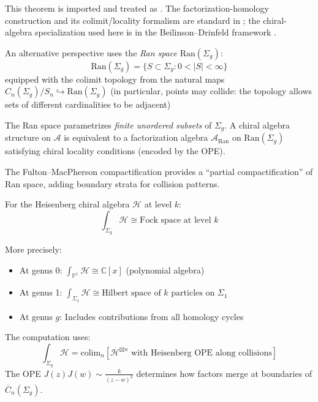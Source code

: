 \begin{remark}
This theorem is imported and treated as \ClaimStatusProvedElsewhere. The
factorization-homology construction and its colimit/locality formalism are
standard in \cite{AF15,CG17}; the chiral-algebra specialization used here is in
the Beilinson--Drinfeld framework \cite[Chapter~3]{BD04}.
\end{remark}

\begin{remark}\label{rem:ran-space}
An alternative perspective uses the \emph{Ran space} $\text{Ran}(\Sigma_g)$:
\[\text{Ran}(\Sigma_g) = \{S \subset \Sigma_g : 0 < |S| < \infty\}\]
equipped with the colimit topology from the natural maps $C_n(\Sigma_g)/S_n \hookrightarrow \text{Ran}(\Sigma_g)$
(in particular, points may collide: the topology allows sets of different cardinalities to be adjacent)

The Ran space parametrizes \emph{finite unordered subsets} of $\Sigma_g$. A chiral algebra structure on $\mathcal{A}$ is equivalent to a factorization algebra $\mathcal{A}_{\text{Ran}}$ on $\text{Ran}(\Sigma_g)$ satisfying chiral locality conditions (encoded by the OPE).

The Fulton--MacPherson compactification provides a ``partial compactification'' of Ran space, adding boundary strata for collision patterns.
\end{remark}

\begin{example}\label{ex:fact-heisenberg}
For the Heisenberg chiral algebra $\mathcal{H}$ at level $k$:
\[\int_{\Sigma_g} \mathcal{H} \cong \text{Fock space at level } k\]

More precisely:
\begin{itemize}
\item At genus 0: $\int_{\mathbb{P}^1} \mathcal{H} \cong \mathbb{C}[x]$ (polynomial algebra)
\item At genus 1: $\int_{\Sigma_1} \mathcal{H} \cong \text{Hilbert space of } k \text{ particles on } \Sigma_1$
\item At genus $g$: Includes contributions from all homology cycles
\end{itemize}

The computation uses:
\[\int_{\Sigma_g} \mathcal{H} = \text{colim}_n \left[\mathcal{H}^{\boxtimes n} \text{ with Heisenberg OPE along collisions}\right]\]
The OPE $J(z)J(w) \sim \frac{k}{(z-w)^2}$ determines how factors merge at boundaries of $\overline{C}_n(\Sigma_g)$.
\end{example}

